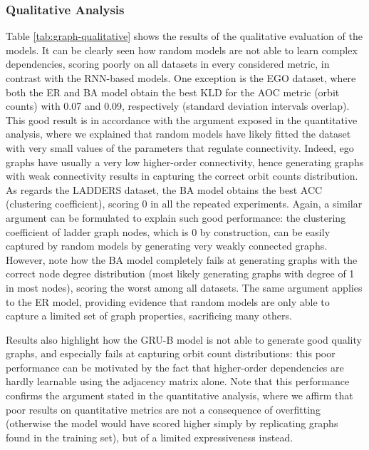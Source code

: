 \subsubsection*{Qualitative Analysis}
Table \ref{tab:graph-qualitative} shows the results of the qualitative evaluation of the models.
It can be clearly seen how random models are not able to learn complex dependencies, scoring poorly on all datasets in every considered metric, in contrast with the RNN-based models. One exception is the EGO dataset, where both the ER and BA model obtain the best KLD for the AOC metric (orbit counts) with 0.07 and 0.09, respectively (standard deviation intervals overlap). This good result is in accordance with the argument exposed in the quantitative analysis, where we explained that random models have likely fitted the dataset with very small values of the parameters that regulate connectivity. Indeed, ego graphs have usually a very low higher-order connectivity, hence generating graphs with weak connectivity results in capturing the correct orbit counts distribution. As regards the LADDERS dataset, the BA model obtains the best ACC (clustering coefficient), scoring $0$ in all the repeated experiments. Again, a similar argument can be formulated to explain such good performance: the clustering coefficient of ladder graph nodes, which is 0 by construction, can be easily captured by random models by generating very weakly connected graphs. However, note how the BA model completely fails at generating graphs with the correct node degree distribution (most likely generating graphs with degree of 1 in most nodes), scoring the worst among all datasets. The same argument applies to the ER model, providing evidence that random models are only able to capture a limited set of graph properties, sacrificing many others.

Results also highlight how the GRU-B model is not able to generate good quality graphs, and especially fails at capturing orbit count distributions: this poor performance can be motivated by the fact that higher-order dependencies are hardly learnable using the adjacency matrix alone. Note that this performance confirms the argument stated in the quantitative analysis, where we affirm that poor results on quantitative metrics are not a consequence of overfitting (otherwise the model would have scored higher simply by replicating graphs found in the training set), but of a limited expressiveness instead.

